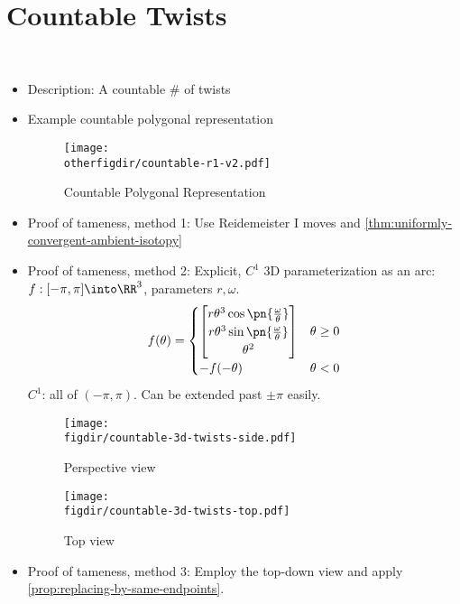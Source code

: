 \section{Countable Twists}
\begin{example}~
  \begin{itemize}
    \item Description: A countable \# of twists
    \item Example countable polygonal representation
      \begin{figure}[H]
        \centering
        \texttt{[image: \\otherfigdir/countable-r1-v2.pdf]}
        \caption{Countable Polygonal Representation}
      \end{figure}
    \item Proof of tameness, method 1: Use Reidemeister I moves and
      \cref{thm:uniformly-convergent-ambient-isotopy}
    \item Proof of tameness, method 2: Explicit, $C^1$ 3D parameterization
      as an arc: $f : [-\pi,\pi] \into \RR^3$, parameters $r, \omega$.
      \[
      f(\theta) =
      \begin{cases}
        \begin{bmatrix}
          r \theta^3 \cos\pn{\frac{\omega}{\theta}} \\
          r \theta^3 \sin\pn{\frac{\omega}{\theta}} \\
          \theta^2
        \end{bmatrix} & \theta \geq 0 \\
        -f(-\theta) & \theta < 0
      \end{cases}
      \]
      $C^1$: all of $(-\pi, \pi)$. Can be extended past $\pm \pi$
      easily.
      \begin{figure}[H]
        \centering
        \texttt{[image: \\figdir/countable-3d-twists-side.pdf]}
        \caption{Perspective view}
        \label{fig:twists-perspective}
      \end{figure}
      \begin{figure}[H]
        \centering
        \texttt{[image: \\figdir/countable-3d-twists-top.pdf]}
        \caption{Top view}
        \label{fig:twists-top}
      \end{figure}
    \item Proof of tameness, method 3: Employ the top-down view and
      apply \cref{prop:replacing-by-same-endpoints}.
  \end{itemize}
\end{example}

